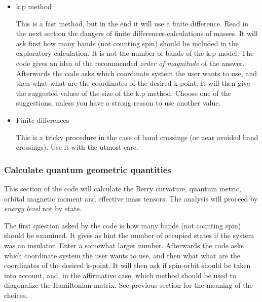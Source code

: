 \documentclass[11pt]{article}
\begin{document}
\begin{itemize}
   \item{k.p method}

   This is a fast method, but in the end it will use a finite difference.
   Read in the next section the dangers of finite differences calculations of masses.
   It will ask first how many bands (not counting spin) should be included
   in the exploratory calculation.  It is not the number of bands
   of the k.p model.
   The code gives an idea of the recommended {\it order of magnitude} of the answer.
   Afterwards the code asks which coordinate system the user wants to use,
   and then what what are the coordinates of the desired k-point.
   It will then give the suggested values of the size of the k.p method.
   Choose one of the suggestions, unless you have a strong reason to use another value.



   \item{Finite differences}

   This is a tricky procedure in the case of band crossings (or near avoided band crossings).
   Use it with the utmost care.

\end{itemize}

\subsubsection{Calculate quantum geometric quantities}

   This section of the code will calculate the Berry curvature, quantum metric,
   orbital magnetic moment and effective mass tensors.
   The analysis will proceed by {\it energy level} not by state.

   The first question asked by the code is how many bands (not counting spin) should be examined.
   It gives as hint the number of occupied states if the system was an insulator.
   Enter a somewhat larger number.
   Afterwards the code asks which coordinate system the user wants to use,
   and then what what are the coordinates of the desired k-point.
   It will then ask if spin-orbit should be taken into account, and, in the
   affirmative case, which method should be used to diagonalize the Hamiltonian matrix.
   See previous section for the meaning of the choices.
\end{document}
